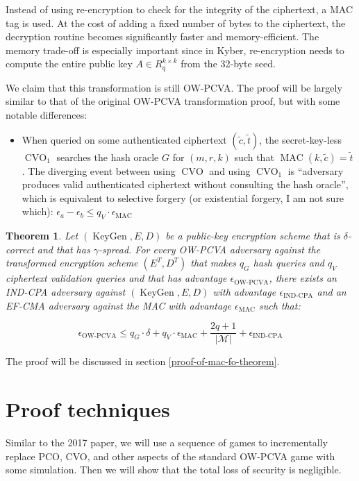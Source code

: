 \documentclass{article}
\newcommand{\norm}[1]{\vert {#1} \vert}
\newcommand{\keygen}{\operatorname{KeyGen}}
\newtheorem{theorem}{Theorem}[section]
\begin{document}
Instead of using re-encryption to check for the integrity of the ciphertext, a MAC tag is used. At the cost of adding a fixed number of bytes to the ciphertext, the decryption routine becomes significantly faster and memory-efficient. The memory trade-off is especially important since in Kyber, re-encryption needs to compute the entire public key $A \in R_q^{k \times k}$ from the 32-byte seed.

We claim that this transformation is still OW-PCVA. The proof will be largely similar to that of the original OW-PCVA transformation proof, but with some notable differences:

\begin{itemize}
    \item When queried on some authenticated ciphertext $(\tilde{c}, \tilde{t})$, the secret-key-less $\operatorname{CVO}_1$ searches the hash oracle $G$ for $(m, r, k)$ such that $\operatorname{MAC}(k, \tilde{c}) = \tilde{t}$. The diverging event between using $\operatorname{CVO}$ and using $\operatorname{CVO}_1$ is ``adversary produces valid authenticated ciphertext without consulting the hash oracle'', which is equivalent to selective forgery (or existential forgery, I am not sure which): $\epsilon_a - \epsilon_b \leq q_V \cdot \epsilon_\text{MAC}$
\end{itemize}

\begin{theorem}\label{mac-fo-theorem}
    Let $(\keygen, E, D)$ be a public-key encryption scheme that is $\delta$-correct and that has $\gamma$-spread. For every OW-PCVA adversary against the transformed encryption scheme $(E^T, D^T)$ that makes $q_G$ hash queries and $q_V$ ciphertext validation queries and that has advantage $\epsilon_\text{OW-PCVA}$, there exists an IND-CPA adversary against $(\keygen, E, D)$ with advantage $\epsilon_\text{IND-CPA}$ and an EF-CMA adversary against the MAC with advantage $\epsilon_\text{MAC}$ such that:

    \begin{equation*}
        \epsilon_\text{OW-PCVA}
        \leq q_G \cdot \delta 
        + q_V \cdot \epsilon_\text{MAC}
        + \frac{2q+1}{\norm{\mathcal{M}}} 
        + \epsilon_\text{IND-CPA}
    \end{equation*}
\end{theorem}

The proof will be discussed in section \ref{proof-of-mac-fo-theorem}.

\section{Proof techniques}
Similar to the 2017 paper, we will use a sequence of games to incrementally replace PCO, CVO, and other aspects of the standard OW-PCVA game with some simulation. Then we will show that the total loss of security is negligible.
\end{document}
